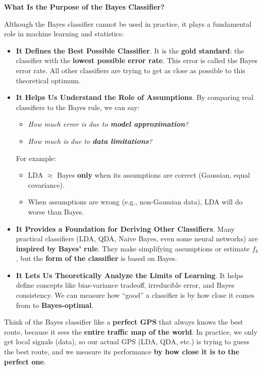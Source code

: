 \begin{flushleft}
    \textcolor{Green3}{ \textbf{What Is the Purpose of the Bayes Classifier?}}
\end{flushleft}
Although the Bayes classifier cannot be used in practice, it plays a fundamental role in machine learning and statistics:
\begin{itemize}[label=\textcolor{Green3}{}]
    \item \textcolor{Green3}{\textbf{It Defines the Best Possible Classifier}}. It is the \textbf{gold standard}: the classifier with the \textbf{lowest possible error rate}. This error is called the Bayes error rate. All other classifiers are trying to get as close as possible to this theoretical optimum.

    \item \textcolor{Green3}{\textbf{It Helps Us Understand the Role of Assumptions}}. By comparing real classifiers to the Bayes rule, we can say:
    \begin{itemize}
        \item \emph{How much error is due to \textbf{model approximation}?}
        \item \emph{How much is due to \textbf{data limitations}?}
    \end{itemize}
    For example:
    \begin{itemize}
        \item LDA $\approx$ Bayes \textbf{only} when its assumptions are correct (Gaussian, equal covariance).
        \item When assumptions are wrong (e.g., non-Gaussian data), LDA will do worse than Bayes.
    \end{itemize}
    
    \item \textcolor{Green3}{\textbf{It Provides a Foundation for Deriving Other Classifiers}}. Many practical classifiers (LDA, QDA, Naive Bayes, even some neural networks) are \textbf{inspired by Bayes' rule}. They make simplifying assumptions or estimate $f_{k}$, but the \textbf{form of the classifier} is based on Bayes.

    \item \textcolor{Green3}{\textbf{It Lets Us Theoretically Analyze the Limits of Learning}}. It helps define concepts like bias-variance tradeoff, irreducible error, and Bayes consistency. We can measure how ``good'' a classifier is by how close it comes from to \textbf{Bayes-optimal}.
\end{itemize}

\highspace
\begin{examplebox}
    Think of the Bayes classifier like a \textbf{perfect GPS} that always knows the best route, because it sees the \textbf{entire traffic map of the world}. In practice, we only get local signals (data), so our actual GPS (LDA, QDA, etc.) is trying to guess the best route, and we measure its performance \textbf{by how close it is to the perfect one}.
\end{examplebox}